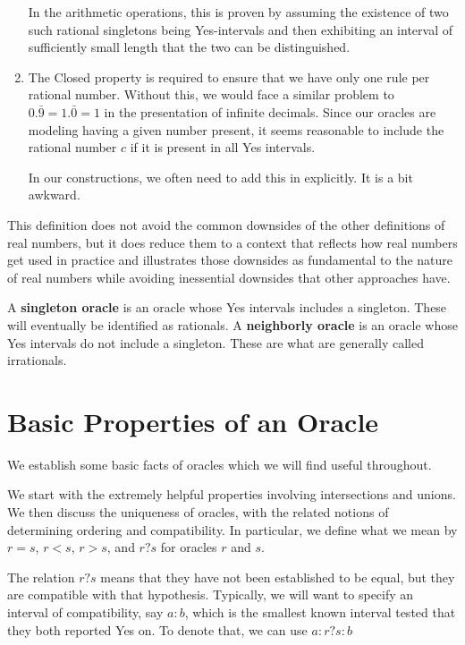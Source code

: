 \documentclass[12pt]{article}
\theoremstyle{remark}
\begin{document}
\begin{enumerate}
    In the arithmetic operations, this is proven by assuming the existence of two such rational singletons being Yes-intervals and then exhibiting an interval of sufficiently small length that the two can be distinguished. 

    \item The Closed property is required to ensure that we have only one rule per rational number. Without this, we would face a similar problem to $0.\bar{9} = 1.\bar{0} = 1$ in the presentation of infinite decimals. Since our oracles are modeling having a given number present, it seems reasonable to include the rational number $c$ if it is present in all Yes intervals. 
    
    In our constructions, we often need to add this in explicitly. It is a bit awkward.

\end{enumerate}


This definition does not avoid the common downsides of the other definitions of real numbers, but it does reduce them to a context that reflects how real numbers get used in practice and illustrates those downsides as fundamental to the nature of real numbers while avoiding inessential downsides that other approaches have.  

A \textbf{singleton oracle }is an oracle whose Yes intervals includes a singleton. These will eventually be identified as rationals. A \textbf{neighborly oracle} is an oracle whose Yes intervals do not include a singleton. These are what are generally called irrationals. 



\section{Basic Properties of an Oracle}

We establish some basic facts of oracles which we will find useful throughout. 

We start with the extremely helpful properties involving intersections and unions. We then discuss the uniqueness of oracles, with the related notions of determining ordering and compatibility. In particular, we define what we mean by $r = s$, $r<s$, $r>s$, and $r?s$ for oracles $r$ and $s$. 


The relation $r?s$ means that they have not been established to be equal, but they are compatible with that hypothesis. Typically, we will want to specify an interval of compatibility, say $a:b$, which is the smallest known interval tested that they both reported Yes on. To denote that, we can use $a:r?s:b$ 
\end{document}
